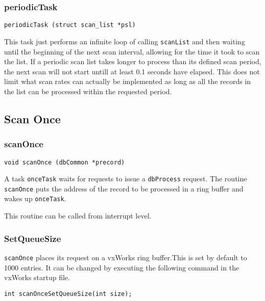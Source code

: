 \subsubsection{periodicTask}

\begin{verbatim}periodicTask (struct scan_list *psl)
\end{verbatim}This task just performs an infinite loop of calling \verb|scanList| and then waiting until the beginning of the next scan 
interval, allowing for the time it took to scan the list. If a periodic scan list takes longer to process than its defined scan 
period, the next scan will not start untill at least 0.1 seconds have elapsed.  This does not limit what scan rates can actually 
be implemented as long as all the records in the list can be processed within the requested period.

\subsection{Scan Once}

\subsubsection{scanOnce}

\begin{verbatim}void scanOnce (dbCommon *precord)
\end{verbatim}A task \verb|onceTask| waits for requests to issue a \verb|dbProcess| request. The routine \verb|scanOnce| puts the address of the 
record to be processed in a ring buffer and wakes up \verb|onceTask|.

This routine can be called from interrupt level.

\subsubsection{SetQueueSize}

\verb|scanOnce| places its request on a vxWorks ring buffer.This is set by default to 1000 entries. It can be changed by 
executing the following command in the vxWorks startup file.

\begin{verbatim}int scanOnceSetQueueSize(int size);
\end{verbatim}










